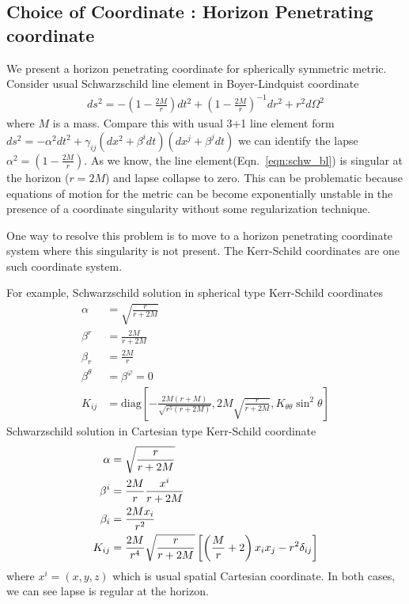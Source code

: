 \documentclass[a4paper,oneside,openany,11pt]{memoir}
\numberwithin{equation}{section} %
\begin{document}
\subsection{Choice of Coordinate : Horizon Penetrating coordinate}
We present a horizon penetrating coordinate for spherically symmetric metric. Consider usual Schwarzschild line element in Boyer-Lindquist coordinate 
\begin{align}
\label{eqn:schw_bl}
ds^2 = - \left(1- \frac{2M}{r} \right) dt^2 + \left(1- \frac{2M}{r} \right)^{-1} dr^2 + r^2 d\Omega^2 
\end{align}
where $M$ is a mass. Compare this with usual 3+1 line element form $ds^2 = - \alpha^2 dt^2 + \gamma_{ij} ( dx^2 + \beta^i dt)(dx^j + \beta^j dt)$ we can identify the lapse $\alpha^2 = \left(1- \frac{2M}{r} \right)$. As we know, the line element(Eqn.~\ref{eqn:schw_bl}) is singular at the horizon ($r=2M$) and lapse collapse to zero. This can be problematic because equations of motion for the metric can be become exponentially unstable in the presence of a coordinate singularity without some regularization technique.

One way to resolve this problem is to move to a horizon penetrating coordinate system where this singularity is not present. The Kerr-Schild coordinates are one such coordinate system. 

For example, Schwarzschild solution in spherical type Kerr-Schild coordinates
\begin{align}
\alpha &= \sqrt{\frac{r}{r+2M}} \\
\beta^r &= \frac{2M}{r+2M} \\
\beta_r &=\frac{2M}{r} \\
\beta^\theta &= \beta^\varphi = 0 \\
K_{ij} &= \textrm{diag} \left[ -\frac{2M(r+M)}{\sqrt{r^5 (r+2M)}} , 2M \sqrt{\frac{r}{r+2M}}, K_{\theta \theta} \sin^2 \theta \right]
\end{align}
Schwarzschild solution in Cartesian type Kerr-Schild coordinate
\begin{align}
\alpha &= \sqrt{\frac{r}{r+2M}} \\
\beta^i &= \frac{2M}{r} \frac{x^i}{r+2M} \\
\beta_i &=\frac{2M x_i}{r^2} \\
K_{ij} &= \-\frac{2M}{r^4} \sqrt{\frac{r}{r+2M}} \left[ \left( \frac{M}{r}+2 \right) x_i x_j - r^2 \delta_{ij} \right]
\end{align}
where $x^i = (x,y,z)$ which is usual spatial Cartesian coordinate. In both cases, we can see lapse is regular at the horizon.
\end{document}
